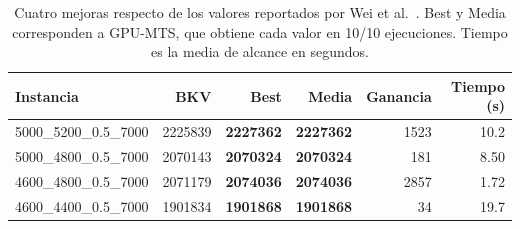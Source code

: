 \begin{table}[tbp]\centering\small
\caption{Cuatro mejoras respecto de los valores reportados por Wei et al.~\cite{Wei2026ANRMA}. Best y Media corresponden a GPU-MTS, que obtiene cada valor en 10/10 ejecuciones. Tiempo es la media de alcance en segundos.}
\label{tab:reference-improvements}
\begin{tabular}{lrrrrr}
\toprule
Instancia & BKV & Best & Media & Ganancia & Tiempo (s)\\
\midrule
5000\_5200\_0.5\_7000 & 2225839 & \textbf{2227362} & \textbf{2227362} & 1523 & 10.2\\
5000\_4800\_0.5\_7000 & 2070143 & \textbf{2070324} & \textbf{2070324} & 181 & 8.50\\
4600\_4800\_0.5\_7000 & 2071179 & \textbf{2074036} & \textbf{2074036} & 2857 & 1.72\\
4600\_4400\_0.5\_7000 & 1901834 & \textbf{1901868} & \textbf{1901868} & 34 & 19.7\\
\bottomrule\end{tabular}
\end{table}
